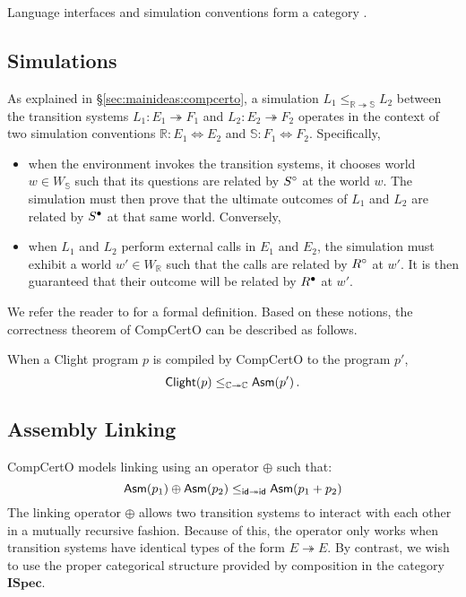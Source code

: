 \documentclass[sigplan,10pt,authordraft]{acmart}
\newcommand{\ISpec}{\mathbf{ISpec}}
\begin{document}
Language interfaces and simulation conventions
form a category \cite{compcerto}.


\subsection{Simulations} %

As explained in \S\ref{sec:mainideas:compcerto},
a simulation
$L_1 \le_{\mathbb{R} \twoheadrightarrow \mathbb{S}} L_2$
between the transition systems
$L_1 : E_1 \twoheadrightarrow F_1$ and
$L_2 : E_2 \twoheadrightarrow F_2$
operates in the context of two simulation conventions
$\mathbb{R} : E_1 \Leftrightarrow E_2$ and
$\mathbb{S} : F_1 \Leftrightarrow F_2$.
Specifically,
\begin{itemize}
\item
when the environment invokes the transition systems,
it chooses world $w \in W_\mathbb{S}$
such that its questions are related by $S^\circ$ at the world $w$.
The simulation must then prove that
the ultimate outcomes of $L_1$ and $L_2$
are related by $S^\bullet$ at that same world.
Conversely,
\item
when $L_1$ and $L_2$ perform external calls in $E_1$ and $E_2$,
the simulation must exhibit a world $w' \in W_\mathbb{R}$
such that the calls are related by $R^\circ$ at $w'$.
It is then guaranteed that their outcome
will be related by $R^\bullet$ at $w'$.
\end{itemize}
We refer the reader to \citet{compcerto}
for a formal definition.
Based on these notions,
the correctness theorem of CompCertO
can be described as follows.

\begin{theorem}
When a Clight program $p$
is compiled by CompCertO
to the program $p'$,
\[
   \mathsf{Clight} (p)
  \le_{\mathbb{C} \twoheadrightarrow \mathbb{C}}
   \mathsf{Asm} (p')
  \,.
\]
\end{theorem}


\subsection{Assembly Linking}

CompCertO models linking using an operator $\oplus$
such that:
\[
   \mathsf{Asm} (p_1) \oplus  \mathsf{Asm} (p_2)
  \le_{ \mathsf{id}  \twoheadrightarrow  \mathsf{id} }
   \mathsf{Asm} (p_1 + p_2)
\]
The linking operator $\oplus$ allows
two transition systems to interact with each other
in a mutually recursive fashion.
Because of this,
the operator only works when transition systems
have identical types of the form $E \twoheadrightarrow E$.
By contrast,
we wish to use the proper categorical structure
provided by composition in the category $\ISpec$.
\end{document}
